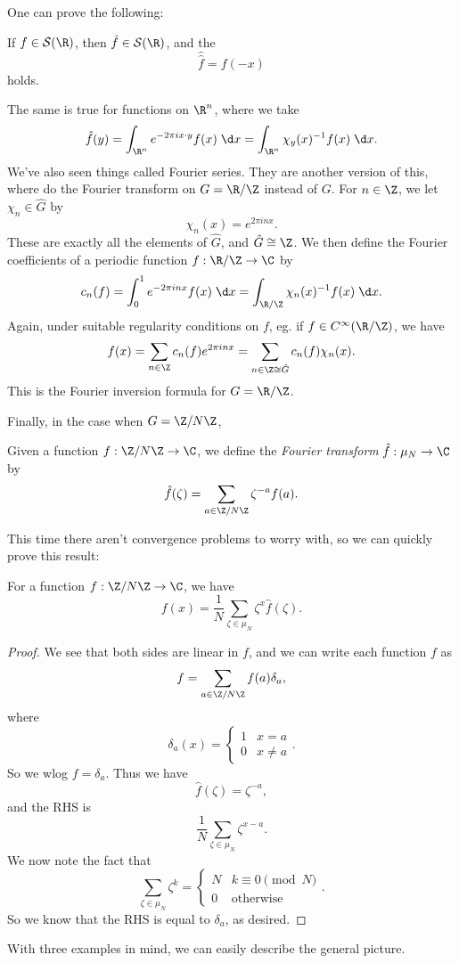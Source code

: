 \documentclass[a4paper]{article}
\begin{document}
One can prove the following:
\begin{prop}
  If $f \in \mathcal{S}(\R)$, then $\hat{f} \in \mathcal{S}(\R)$, and the 
  \[
    \hat{\hat{f}} = f(-x)
  \]
  holds.
\end{prop}

The same is true for functions on $\R^n$, where we take
\[
  \hat{f}(y) = \int_{\R^n} e^{-2\pi i x\cdot y} f(x) \;\d x = \int_{\R^n} \chi_y(x)^{-1} f(x)\;\d x.
\]
We've also seen things called Fourier series. They are another version of this, where do the Fourier transform on $G = \R/\Z$ instead of $G$. For $n \in \Z$, we let $\chi_n \in \hat{G}$ by
\[
  \chi_n(x) = e^{2\pi i nx}.
\]
These are exactly all the elements of $\hat{G}$, and $\hat{G} \cong \Z$. We then define the Fourier coefficients of a periodic function $f: \R/\Z \to \C$ by
\[
  c_n(f) = \int_0^1 e^{-2\pi i n x} f(x) \;\d x = \int_{\R/\Z} \chi_n(x)^{-1} f(x) \;\d x.
\]
Again, under suitable regularity conditions on $f$, eg. if $f \in C^\infty(\R/\Z)$, we have
\[
  f(x) = \sum_{n \in \Z} c_n(f) e^{2\pi i nx} = \sum_{n \in \Z \cong \hat{G}} c_n(f) \chi_n(x).
\]
This is the Fourier inversion formula for $G = \R/\Z$.

Finally, in the case when $G = \Z/N\Z$,
\begin{defi}
  Given a function $f: \Z/N\Z \to \C$, we define the \emph{Fourier transform} $\hat{f}: \mu_N \to \C$ by
  \[
    \hat{f}(\zeta) = \sum_{a \in \Z/N\Z} \zeta^{-a} f(a).
  \]
\end{defi}

This time there aren't convergence problems to worry with, so we can quickly prove this result:
\begin{prop}
  For a function $f: \Z/N\Z \to \C$, we have
  \[
    f(x) = \frac{1}{N} \sum_{\zeta \in \mu_N} \zeta^x \hat{f}(\zeta).
  \]
\end{prop}

\begin{proof}
  We see that both sides are linear in $f$, and we can write each function $f$ as
  \[
    f = \sum_{a \in \Z/N\Z} f(a) \delta_a,
  \]
  where
  \[
    \delta_a(x) =
    \begin{cases}
      1 & x = a\\
      0 & x \not= a
    \end{cases}.
  \]
  So we wlog $f = \delta_a$. Thus we have
  \[
    \hat{f}(\zeta) = \zeta^{-a},
  \]
  and the RHS is
  \[
    \frac{1}{N} \sum_{\zeta \in \mu_N} \zeta^{x - a}.
  \]
  We now note the fact that
  \[
    \sum_{\zeta \in \mu_N} \zeta^k =
    \begin{cases}
      N & k \equiv 0 \pmod N\\
      0 & \text{otherwise}
    \end{cases}.
  \]
  So we know that the RHS is equal to $\delta_a$, as desired.
\end{proof}
With three examples in mind, we can easily describe the general picture.
\end{document}
